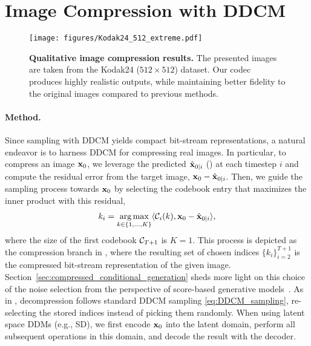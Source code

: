 


\section{Image Compression with DDCM}\label{section:compression}
\begin{figure*}[t]
    \centering
    \texttt{[image: figures/Kodak24\_512\_extreme.pdf]}
    \caption{\textbf{Qualitative image compression results.} The presented images are taken from the Kodak24 ($512\times 512$) dataset.
    Our codec produces highly realistic outputs, while maintaining better fidelity to the original images compared to previous methods.
    }
    \label{fig:compression_examples}
\end{figure*}
\paragraph{Method.}
Since sampling with DDCM yields compact bit-stream representations, a natural endeavor is to harness DDCM for compressing real images.
In particular, to compress an image ${\mathbf{x}}_{0}$, we leverage the predicted $\hat{{\mathbf{x}}}_{0|i}$ () at each timestep $i$ and compute the residual error from the target image, ${\mathbf{x}}_0-\hat{{\mathbf{x}}}_{0|i}$.
Then, we guide the sampling process towards ${\mathbf{x}}_0$ by selecting the codebook entry that maximizes the inner product with this residual,
\begin{align}\label{eq:compression_rule} 
    k_i = \operatorname*{arg\,max}_{k\in\{1,\hdots,K\}} \langle {\mathcal{C}}_i(k), {\mathbf{x}}_0-\hat{{\mathbf{x}}}_{0|i}\rangle,
\end{align}
where the size of the first codebook ${\mathcal{C}}_{T+1}$ is $K=1$. 
This process is depicted as the compression branch in , where the resulting set of chosen indices $\{k_i\}_{i=2}^{T+1}$ is the compressed bit-stream representation of the given image.
Section~\ref{sec:compressed_conditional_generation} sheds more light on this choice of the noise selection from the perspective of score-based generative models~\citep{song2020score}. 
As in , decompression follows standard DDCM sampling \cref{eq:DDCM_sampling}, re-selecting the stored indices instead of picking them randomly.
When using latent space DDMs (e.g., SD), we 
first encode ${\mathbf{x}}_0$ into the latent domain, perform all subsequent operations in this domain, and decode the result with the decoder.

